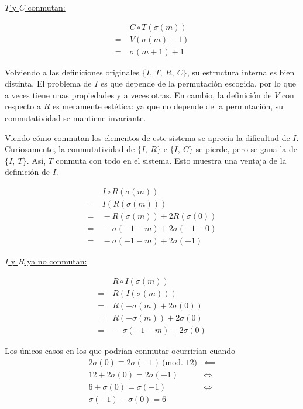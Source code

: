 \begin{center}
\begin{multicols}{3}
				\underline{$T$ y $C$ conmutan:}
				
				\begin{align*}
				&\ C\circ T(\sigma(m))\\
				=&\ V(\sigma(m)+1)\\
				=&\ \sigma(m+1)+1
				\end{align*}
			\end{multicols}
		\end{center}
		
		Volviendo a las definiciones originales $\{I,\ T,\ R,\ C\}$, su estructura interna es bien distinta. El problema de $I$ es que depende de la permutaci\'on escogida, por lo que a veces tiene unas propiedades y a veces otras. En cambio, la definici\'on de $V$ con respecto a $R$ es meramente est\'etica: ya que no depende de la permutaci\'on, su conmutatividad se mantiene invariante. 
		
		Viendo c\'omo conmutan los elementos de este sistema se aprecia la dificultad de $I$. Curiosamente, la conmutatividad de $\{I,\ R\}$ e $\{I,\ C\}$ se pierde, pero se gana la de $\{I,\ T\}$. As\'i, $T$ conmuta con todo en el sistema. Esto muestra una ventaja de la definici\'on de $I$.
		
		\begin{multicols}{3}
			\begin{align*}
		&\ I\circ R(\sigma(m))\\
		=&\ I(R(\sigma(m)))\\
		=&\ -R(\sigma(m))+2R(\sigma(0))\\
		=&\ -\sigma(-1-m)+2\sigma(-1-0)\\
		=&\ -\sigma(-1-m)+2\sigma(-1)
		\end{align*}
		
		\underline{$I$ y $R$ ya no conmutan:}
		
		\begin{align*}
		&\ R\circ I(\sigma(m))\\
		=&\ R(I(\sigma(m)))\\
		=&\ R(-\sigma(m)+2\sigma(0))\\
		=&\ R(-\sigma(m))+2\sigma(0)\\
		=&\ -\sigma(-1-m)+2\sigma(0)
		\end{align*}
		\end{multicols}
		
		Los \'unicos casos en los que podr\'ian conmutar ocurrir\'ian cuando
		\begin{align*}
		2\sigma(0)\equiv2\sigma(-1)\ \mbox{(mod. 12)}&\impliedby\\
		12+2\sigma(0)=2\sigma(-1)&\Longleftrightarrow\\
		6+\sigma(0)=\sigma(-1)&\Longleftrightarrow\\
		\sigma(-1)-\sigma(0)=6&
		\end{align*}
		
